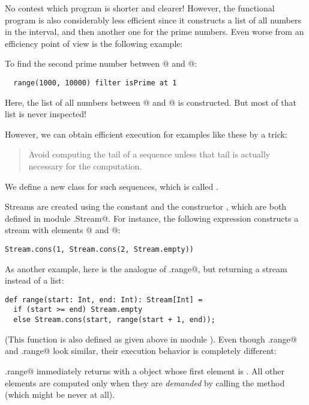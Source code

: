 \documentclass[11pt]{book}
\begin{document}
No contest which program is shorter and clearer!  However, the
functional program is also considerably less efficient since it
constructs a list of all numbers in the interval, and then another one
for the prime numbers. Even worse from an efficiency point of view is
the following example:

To find the second prime number between @ and @:
\begin{verbatim}
  range(1000, 10000) filter isPrime at 1
\end{verbatim}
Here, the list of all numbers between @ and @ is
constructed.  But most of that list is never inspected!

However, we can obtain efficient execution for examples like these by
a trick:
\begin{quote}
 Avoid computing the tail of a sequence unless that tail is actually
     necessary for the computation.
\end{quote}
We define a new class for such sequences, which is called \verb@Stream@.

Streams are created using the constant \verb@empty@ and the constructor \verb@cons@,
which are both defined in module \verb@scala.Stream@. For instance, the following
expression constructs a stream with elements @ and @:
\begin{verbatim}
Stream.cons(1, Stream.cons(2, Stream.empty))
\end{verbatim}
As another example, here is the analogue of \verb@List.range@,
but returning a stream instead of a list:
\begin{verbatim}
def range(start: Int, end: Int): Stream[Int] = 
  if (start >= end) Stream.empty
  else Stream.cons(start, range(start + 1, end));
\end{verbatim}
(This function is also defined as given above in module
\verb@Stream@).  Even though \verb@Stream.range@ and \verb@List.range@
look similar, their execution behavior is completely different: 

\verb@Stream.range@ immediately returns with a \verb@Stream@ object
whose first element is \verb@start@.  All other elements are computed
only when they are \emph{demanded} by calling the \verb@tail@ method
(which might be never at all).  
\end{document}
